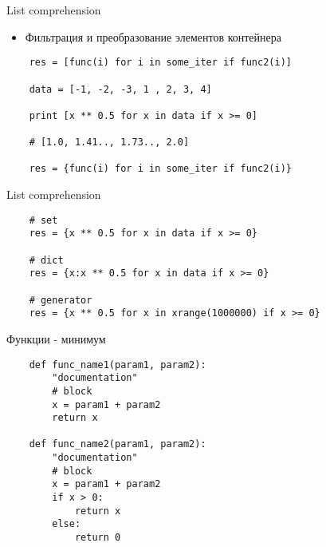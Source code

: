 \documentclass{article}
\begin{document}
\begin{center} List comprehension \end{center}
\vspace{15pt}
\begin{itemize}
	\item Фильтрация и преобразование элементов контейнера
\end{itemize}
\begin{lstlisting}
	res = [func(i) for i in some_iter if func2(i)]

	data = [-1, -2, -3, 1 , 2, 3, 4]

	print [x ** 0.5 for x in data if x >= 0]

	# [1.0, 1.41.., 1.73.., 2.0]

	res = {func(i) for i in some_iter if func2(i)}
\end{lstlisting}
\newpage

\begin{center} List comprehension \end{center}
\begin{lstlisting}
	# set 
	res = {x ** 0.5 for x in data if x >= 0}

	# dict
	res = {x:x ** 0.5 for x in data if x >= 0}

	# generator
	res = {x ** 0.5 for x in xrange(1000000) if x >= 0}
\end{lstlisting}
\newpage

\begin{center} Функции - минимум \end{center}
\begin{lstlisting}
	def func_name1(param1, param2):
		"documentation"
		# block
		x = param1 + param2
		return x

	def func_name2(param1, param2):
		"documentation"
		# block
		x = param1 + param2
		if x > 0:
			return x
		else:
			return 0
\end{lstlisting}
\newpage
\end{document}
